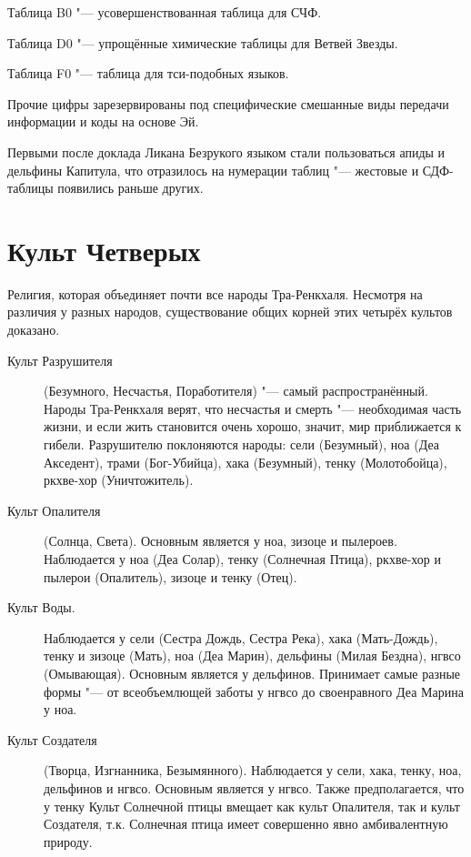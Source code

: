 \documentclass[a4paper,10pt]{book}
\begin{document}
Таблица B0 "--- усовершенствованная таблица для СЧФ.

Таблица D0 "--- упрощённые химические таблицы для Ветвей Звезды.

Таблица F0 "--- таблица для тси-подобных языков.

Прочие цифры зарезервированы под специфические смешанные виды передачи 
информации и коды на основе Эй.

Первыми после доклада Ликана Безрукого языком стали пользоваться
апиды и дельфины Капитула, что отразилось на нумерации таблиц "--- жестовые и 
СДФ-таблицы появились раньше других.

\section{Культ Четверых}

Религия, которая объединяет почти все народы Тра-Ренкхаля. Несмотря на различия 
у разных народов, существование общих корней этих четырёх культов доказано.

\begin{description}
\item[Культ Разрушителя] (Безумного, Несчастья, Поработителя) "--- самый 
распространённый. Народы Тра-Ренкхаля верят, что несчастья и смерть "--- 
необходимая часть жизни, и если жить становится очень хорошо, значит, мир 
приближается к гибели. Разрушителю поклоняются народы: сели (Безумный), ноа 
(Деа 
Акседент), трами (Бог-Убийца), хака (Безумный), тенку (Молотобойца), ркхве-хор 
(Уничтожитель).

\item[Культ Опалителя] (Солнца, Света). Основным является у ноа, зизоце и 
пылероев. 
Наблюдается у ноа (Деа Солар), тенку (Солнечная Птица), ркхве-хор и пылерои 
(Опалитель), зизоце и тенку (Отец).

\item[Культ Воды.] Наблюдается у сели (Сестра Дождь, Сестра Река), хака 
(Мать-Дождь), 
тенку и зизоце (Мать), ноа (Деа Марин), дельфины (Милая Бездна), нгвсо 
(Омывающая). Основным является у дельфинов. Принимает самые разные формы "--- 
от 
всеобъемлющей заботы у нгвсо до своенравного Деа Марина у ноа.

\item[Культ Создателя] (Творца, Изгнанника, Безымянного). Наблюдается у сели, 
хака, 
тенку, ноа, дельфинов и нгвсо. Основным является у нгвсо. Также предполагается, 
что у тенку Культ Солнечной птицы вмещает как культ Опалителя, так и культ 
Создателя, т.к. Солнечная птица имеет совершенно явно амбивалентную природу.
\end{description}
\end{document}
